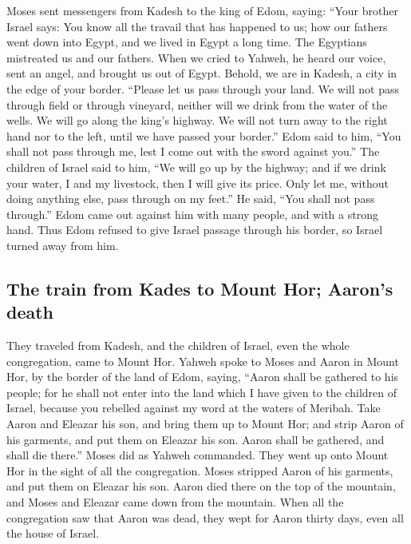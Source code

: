  Moses sent messengers from Kadesh to the king of Edom,
saying: ``Your brother Israel says: You know all the travail that has
happened to us;  how our fathers went down into Egypt,
and we lived in Egypt a long time. The Egyptians mistreated us and our
fathers.  When we cried to Yahweh, he heard our voice,
sent an angel, and brought us out of Egypt. Behold, we are in Kadesh, a
city in the edge of your border.  ``Please let us pass
through your land. We will not pass through field or through vineyard,
neither will we drink from the water of the wells. We will go along the
king's highway. We will not turn away to the right hand nor to the left,
until we have passed your border.''  Edom said to him,
``You shall not pass through me, lest I come out with the sword against
you.''  The children of Israel said to him, ``We will go
up by the highway; and if we drink your water, I and my livestock, then
I will give its price. Only let me, without doing anything else, pass
through on my feet.''  He said, ``You shall not pass
through.'' Edom came out against him with many people, and with a strong
hand.  Thus Edom refused to give Israel passage through
his border, so Israel turned away from him.

\hypertarget{the-train-from-kades-to-mount-hor-aarons-death}{%
\subsection{The train from Kades to Mount Hor; Aaron's
death}\label{the-train-from-kades-to-mount-hor-aarons-death}}

 They traveled from Kadesh, and the children of Israel,
even the whole congregation, came to Mount Hor.  Yahweh
spoke to Moses and Aaron in Mount Hor, by the border of the land of
Edom, saying,  ``Aaron shall be gathered to his people;
for he shall not enter into the land which I have given to the children
of Israel, because you rebelled against my word at the waters of
Meribah.  Take Aaron and Eleazar his son, and bring them
up to Mount Hor;  and strip Aaron of his garments, and
put them on Eleazar his son. Aaron shall be gathered, and shall die
there.''  Moses did as Yahweh commanded. They went up
onto Mount Hor in the sight of all the congregation. 
Moses stripped Aaron of his garments, and put them on Eleazar his son.
Aaron died there on the top of the mountain, and Moses and Eleazar came
down from the mountain.  When all the congregation saw
that Aaron was dead, they wept for Aaron thirty days, even all the house
of Israel.

